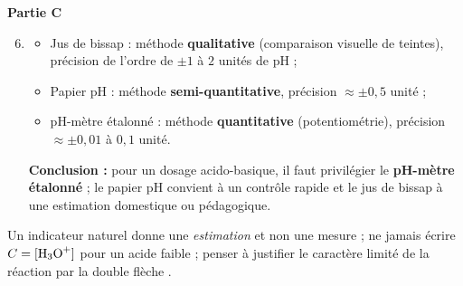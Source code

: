 \documentclass[11pt]{article}
\begin{document}
\begin{corrige}
\textbf{Partie C}
\begin{enumerate}
    \setcounter{enumi}{5}
    \item \begin{itemize}
        \item Jus de bissap : méthode \textbf{qualitative} (comparaison visuelle de teintes), précision de l'ordre de $\pm 1$ à $2$ unités de pH ;
        \item Papier pH : méthode \textbf{semi-quantitative}, précision $\approx \pm 0{,}5$ unité ;
        \item pH-mètre étalonné : méthode \textbf{quantitative} (potentiométrie), précision $\approx \pm 0{,}01$ à $0{,}1$ unité.
    \end{itemize}
    \textbf{Conclusion :} pour un dosage acido-basique, il faut privilégier le \textbf{pH-mètre étalonné} ; le papier pH convient à un contrôle rapide et le jus de bissap à une estimation domestique ou pédagogique.
\end{enumerate}

\begin{attention}
Un indicateur naturel donne une \emph{estimation} et non une mesure ; ne jamais écrire $C = [\ce{H3O+}]$ pour un acide faible ; penser à justifier le caractère limité de la réaction par la double flèche \ce{<=>}.
\end{attention}
\end{corrige}
\end{document}
